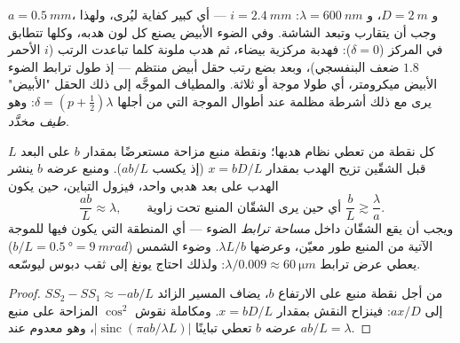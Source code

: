 \begin{example}\label{ex:b2:two-wave-interference:numbers}
$a = \qty{0.5}{mm}$، و $D = \qty{2}{m}$، و $\lambda = \qty{600}{nm}$: $i = \qty{2.4}{mm}$ --- أي كبير
كفاية ليُرى، ولهذا وجب أن يتقارب  وتبعد
الشاشة. وفي الضوء الأبيض يصنع كل لون هدبه، وكلها
تتطابق في المركز ($\delta = 0$): فهدبة مركزية بيضاء، ثم
هدب ملونة كلما تباعدت الرتب ($i$ الأحمر $1.8$ ضعف
البنفسجي)، وبعد بضع رتب حقل أبيض منتظم --- إذ
طول ترابط الضوء الأبيض ميكرومتر، أي طولا موجة أو ثلاثة.
والمطياف الموجَّه إلى ذلك الحقل "الأبيض" يرى مع ذلك
أشرطة مظلمة عند أطوال الموجة التي من أجلها $\delta = (p + \tfrac12)\lambda$: وهو
\emph{طيف مخدَّد}.
\end{example}

\begin{proposition}\label{prop:b2:two-wave-interference:spatial}
كل نقطة من  تعطي نظام هدبها؛ ونقطة
منبع مزاحة مستعرضًا بمقدار $b$ على البعد $L$ قبل
الشقّين تزيح الهدب بمقدار $x = bD/L$ (إذ يكسب 
$ab/L$). ومنبع عرضه $b$ ينشر الهدب على بعد هدبي واحد،
فيزول التباين، حين يكون
\[
\frac{ab}L \approx \lambda , \qquad\text{أي حين يرى الشقّان المنبع تحت زاوية } \frac bL \gtrsim \frac\lambda a .
\]
ويجب أن يقع الشقّان داخل \emph{مساحة ترابط} الضوء ---
أي المنطقة التي يكون فيها للموجة الآتية من المنبع طور معيّن،
وعرضها $\lambda L/b$. وضوء الشمس ($b/L = \qty{0.5}{\degree} = \qty{9}{mrad}$)
يعطي عرض ترابط $\lambda/0.009 \approx \qty{60}{\micro m}$: ولذلك احتاج يونغ إلى
ثقب دبوس ليوسّعه.
\end{proposition}

\begin{proof}
من أجل نقطة منبع على الارتفاع $b$، يضاف المسير الزائد $SS_2 - SS_1 \approx -ab/L$
إلى $ax/D$: فينزاح النقش بمقدار $x = bD/L$. ومكاملة نقوش
$\cos^2$ المزاحة على منبع عرضه $b$ تعطي تباينًا
$|\operatorname{sinc}(\pi ab/\lambda L)|$، وهو معدوم عند $ab/L = \lambda$.
\end{proof}

